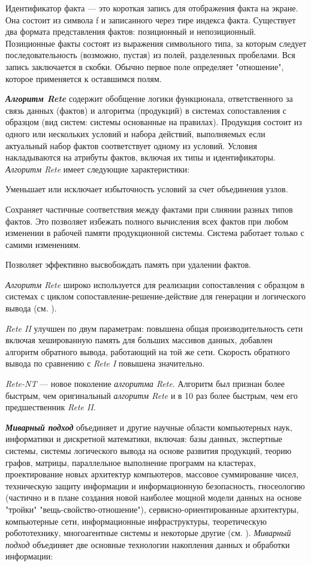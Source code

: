 Идентификатор факта --- это короткая запись для отображения факта на экране. Она состоит из символа f и записанного через тире индекса факта. Существует два формата представления фактов: позиционный и непозиционный. Позиционные факты состоят из выражения символьного типа, за которым следует последовательность (возможно, пустая) из полей, разделенных пробелами. Вся запись заключается в скобки. Обычно первое поле определяет "отношение"{}, которое применяется к оставшимся полям.


\textbf{\textit{Алгоритм Rete}} содержит обобщение логики функционала, ответственного за связь данных (фактов) и алгоритма (продукций) в системах сопоставления с образцом (вид систем: системы основанные на правилах). Продукция состоит из одного или нескольких условий и набора действий, выполняемых если актуальный набор фактов соответствует одному из условий. Условия накладываются на атрибуты фактов, включая их типы и идентификаторы. \textit{Алгоритм Rete} имеет следующие характеристики:
\begin{textitemize}
	\item{Уменьшает или исключает избыточность условий за счет объединения узлов.}
	\item{Сохраняет частичные соответствия между фактами при слиянии разных типов фактов. Это позволяет избежать полного вычисления всех фактов при любом изменении в рабочей памяти продукционной системы. Система работает только с самими изменениям.}
	\item{Позволяет эффективно высвобождать память при удалении фактов.}
\end{textitemize}

\textit{Алгоритм Rete} широко используется для реализации сопоставления с образцом в системах с циклом сопоставление-решение-действие для генерации и логического вывода (см. ).

\textit{Rete II} улучшен по двум параметрам: повышена общая производительность сети включая хешированную память для больших массивов данных, добавлен алгоритм обратного вывода, работающий на той же сети. Скорость обратного вывода по сравнению с \textit{Rete I} повышена значительно.

\textit{Rete-NT} --- новое поколение \textit{алгоритма Rete}. Алгоритм был признан более быстрым, чем оригинальный \textit{алгоритм Rete} и в 10 раз более быстрым, чем его предшественник \textit{Rete II}. 

\textbf{\textit{Миварный подход}} объединяет и другие научные области компьютерных наук, информатики и дискретной математики, включая: базы данных, экспертные системы, системы логического вывода на основе развития продукций, теорию графов, матрицы, параллельное выполнение программ на кластерах, проектирование новых архитектур компьютеров, массовое суммирование чисел, техническую защиту информации и информационную безопасность, гносеологию (частично и в плане создания новой наиболее мощной модели данных на основе "тройки"{} "вещь-свойство-отношение"{}), сервисно-ориентированные архитектуры, компьютерные сети, информационные инфраструктуры, теоретическую робототехнику, многоагентные системы и некоторые другие (см. ). \textit{Миварный подход} объединяет две основные технологии накопления данных и обработки информации:

